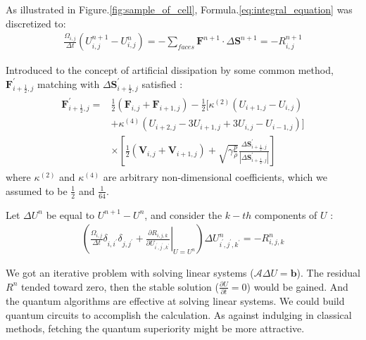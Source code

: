 \documentclass[%
 reprint,
 amsmath,amssymb,
pra,
]{revtex4-1}
\begin{document}
\begin{itemize}
As illustrated in Figure.\ref{fig:sample_of_cell}, Formula.\ref{eq:integral_equation} was discretized to:
\begin{align}
	\frac{\Omega_{i, j}}{\Delta t}\left(U^{n+1}_{i, j}-U^{n}_{i, j} \right) = -\sum_{faces}\bm{F}^{n+1}\cdot\Delta\bm{S}^{n+1} = -R^{n+1}_{i, j}
\end{align}

Introduced to the concept of artificial dissipation by some common method, $\bm{F}^\prime_{i+\frac{1}{2}, j}$ matching with $\Delta\bm{S}^\prime_{i+\frac{1}{2}, j}$ satisfied \cite{hirsch2007numerical} \cite{jameson1981numerical}:
\begin{align}
\begin{split}
    \bm{F}^\prime_{i+\frac{1}{2}, j} =& \frac{1}{2}\left(\bm{F}_{i, j} + \bm{F}_{i + 1, j}\right) - \frac{1}{2}\big[\kappa^{\left(2\right)}\left(U_{i+1, j}-U_{i, j}\right)\\
    &+\kappa^{\left(4\right)}\left(U_{i+2, j}-3 U_{i+1, j}+3 U_{i, j}-U_{i-1, j}\right)\big]\\
    &\times\left[\frac{1}{2}\left(\bm{V}_{i, j} + \bm{V}_{i + 1, j}\right) + \sqrt{\gamma \frac{p}{\rho}}\frac{\Delta\bm{S}^\prime_{i+\frac{1}{2}, j}}{\left|\Delta\bm{S}^\prime_{i+\frac{1}{2}, j}\right|}\right]
\end{split}
\end{align}
where $\kappa^{\left(2\right)}$ and $\kappa^{\left(4\right)}$ are arbitrary non-dimensional coefficients, which we assumed to be $\frac{1}{2}$ and $\frac{1}{64}$.

Let $\Delta U^{n}$ be equal to $U^{n+1}-U^{n}$, and consider the $k-th$ components of $U$ \cite{economon2015su2}:
\begin{align}
	\left(\frac{\Omega_{i, j}}{\Delta t}\delta_{i, i^\prime}\delta_{j, j^\prime}+\left.\frac{\partial R_{i,j,k}}{\partial U_{i^\prime,j^\prime,k^\prime}}\right|_{U=U^n}\right)\Delta U^{n}_{i^\prime,j^\prime,k^\prime} = -R^{n}_{i,j,k}
\end{align}

We got an iterative problem with solving linear systems ($\mathcal{A} \Delta U = \bm{b}$). The residual $R^{n}$ tended toward zero, then the stable solution ($\frac{\partial U}{\partial t} = 0$) would be gained. And the quantum algorithms are effective at solving linear systems. We could build quantum circuits to accomplish the calculation. As against indulging in classical methods, fetching the quantum superiority might be more attractive.




\end{itemize}
\end{document}
